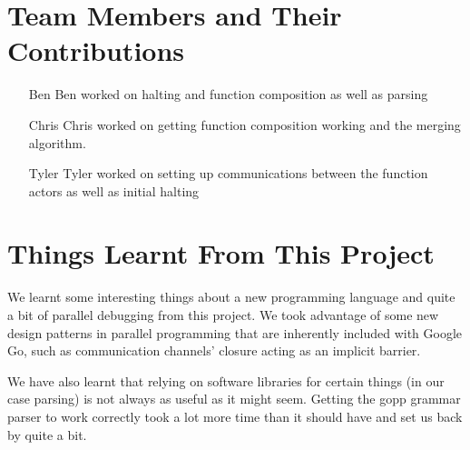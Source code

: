 \documentclass{acm_proc_article-sp}
\begin{document}
\section{Team Members and Their Contributions}
	\begin{itemize}
		\item[Ben] Ben worked on halting and function composition as well as
			parsing
		\item[Chris] Chris worked on getting function composition working and
			the merging algorithm. 
		\item[Tyler] Tyler worked on setting up communications between the
			function actors as well as initial halting
	\end{itemize}
\section{Things Learnt From This Project}

We learnt some interesting things about a new programming language and quite a
bit of parallel debugging from this project. We took advantage of some new
design patterns in parallel programming that are inherently included with
Google Go, such as communication channels' closure acting as an implicit
barrier.

We have also learnt that relying on software libraries for certain things (in
our case parsing) is not always as useful as it might seem. Getting the gopp
grammar parser to work correctly took a lot more time than it should have and
set us back by quite a bit.
\end{document}
